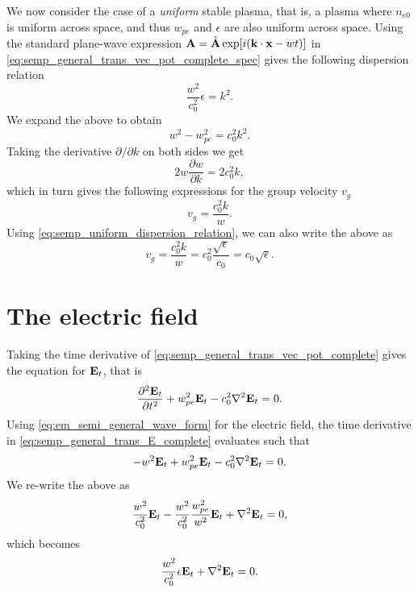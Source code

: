 \documentclass[a4paper,11pt]{report}
\begin{document}
We now consider the case of a \textit{uniform} stable plasma, that is, a plasma where $n_{e0}$ is uniform across space, and thus $w_{pe}$ and $\epsilon$ are also uniform across space. Using the standard plane-wave expression $\mathbf{A} = \hat{\mathbf{A}} \exp[i (\mathbf{k} \cdot \mathbf{x} - wt)]$ in \cref{eq:semp_general_trans_vec_pot_complete_spec} gives the following dispersion relation
\begin{equation}
    \label{eq:semp_uniform_dispersion_relation}
    \frac{w^2}{c_0^2} \epsilon = k^2.
\end{equation}
We expand the above to obtain
\begin{equation*}
    w^2 - w_{pe}^2 = c_0^2 k^2.
\end{equation*}
Taking the derivative $\partial / \partial k$ on both sides we get
\begin{equation*}
    2w \frac{\partial w}{\partial k} = 2 c_0^2 k,
\end{equation*}
which in turn gives the following expressions for the group velocity $v_g$
\begin{equation}
    v_g = \frac{c_0^2 k}{w}.
\end{equation}
Using \cref{eq:semp_uniform_dispersion_relation}, we can also write the above as
\begin{equation}
    v_g = \frac{c_0^2 k}{w} = c_0^2 \frac{\sqrt{\epsilon}}{c_0} = c_0 \sqrt{\epsilon}.
\end{equation}

\section{The electric field}
Taking the time derivative of \cref{eq:semp_general_trans_vec_pot_complete} gives the equation for $\mathbf{E}_t$, that is
\begin{equation}
    \label{eq:semp_general_trans_E_complete}
    \frac{\partial^2 \mathbf{E}_t}{\partial t^2} + w_{pe}^2 \mathbf{E}_t - c_0^2 \nabla^2 \mathbf{E}_t = 0.
\end{equation}
Using \cref{eq:em_semi_general_wave_form} for the electric field, the time derivative in \cref{eq:semp_general_trans_E_complete} evaluates such that 
\begin{equation*}
    -w^2 \mathbf{E}_t + w_{pe}^2 \mathbf{E}_t - c_0^2 \nabla^2 \mathbf{E}_t = 0.
\end{equation*}
We re-write the above as 
\begin{equation*}
    \frac{w^2}{c_0^2} \mathbf{E}_t - \frac{w^2}{c_0^2} \frac{w_{pe}^2}{w^2} \mathbf{E}_t + \nabla^2 \mathbf{E}_t = 0,
\end{equation*}
which becomes
\begin{equation}
    \label{eq:semp_general_trans_E_complete_spec}
    \frac{w^2}{c_0^2} \epsilon \mathbf{E}_t + \nabla^2 \mathbf{E}_t = 0.
\end{equation}
\end{document}
